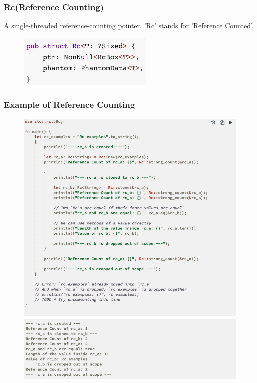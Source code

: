 % 
\begin{frame}[fragile]
    \frametitle{\href{https://doc.rust-lang.org/rust-by-example/std/rc.html}{Rc(Reference Counting)}}

A single-threaded reference-counting pointer. 'Rc' stands for 'Reference Counted'.

    \begin{figure}
    \includegraphics[width=0.8\linewidth]{figs/struct-rc.png}
    \end{figure}

\end{frame}
% 
% 
% 
% 
% 
% 
\begin{frame}[fragile]
    \frametitle{Example of Reference Counting}
    \begin{figure}
    \includegraphics[width=0.8\linewidth]{figs/rc-example.png}
    \end{figure}

\end{frame}
